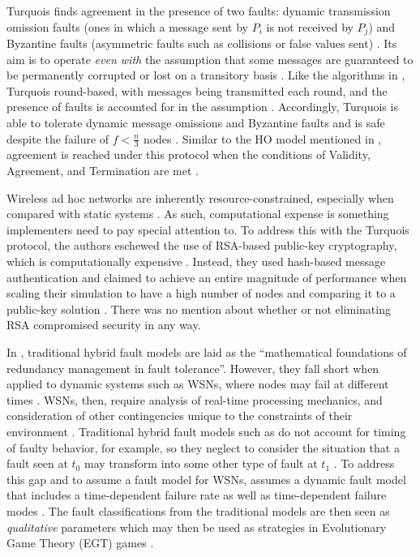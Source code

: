\documentclass[twoside, conference]{IEEEtran}
\begin{document}
Turquois finds agreement in the presence of two faults: dynamic transmission omission faults (ones in which a message sent by $P_i$ is not received by $P_j$) and Byzantine faults (asymmetric faults such as collisions or false values sent) \cite{Moniz2013}. Its aim is to operate \textit{even with} the assumption that some messages are guaranteed to be permanently corrupted or lost on a transitory basis \cite{Moniz2013}. Like the algorithms in \cite{Biely2007}, Turquois round-based, with messages being transmitted each round, and the presence of faults is accounted for in the assumption \cite{Moniz2013}. Accordingly, Turquois is able to tolerate dynamic message omissions and Byzantine faults and is safe despite the failure of $f < \frac{n}{3}$ nodes \cite{Moniz2013}. Similar to the HO model mentioned in \cite{Biely2007}, agreement is reached under this protocol when the conditions of Validity, Agreement, and Termination are met \cite{Moniz2013}.

Wireless ad hoc networks are inherently resource-constrained, especially when compared with static systems \cite{Moniz2013}. As such, computational expense is something implementers need to pay special attention to. To address this with the Turquois protocol, the authors eschewed the use of RSA-based public-key cryptography, which is computationally expensive \cite{Moniz2013}. Instead, they used hash-based message authentication and claimed to achieve an entire magnitude of performance when scaling their simulation to have a high number of nodes and comparing it to a public-key solution \cite{Moniz2013}. There was no mention about whether or not eliminating RSA compromised security in any way.

In \cite{Ma2008}, traditional hybrid fault models are laid as the ``mathematical foundations of redundancy management in fault tolerance''. However, they fall short when applied to dynamic systems such as WSNs, where nodes may fail at different times \cite{Ma2008}. WSNs, then, require analysis of real-time processing mechanics, and consideration of other contingencies unique to the constraints of their environment \cite{Ma2008}. Traditional hybrid fault models such as \cite{Azadmanesh2000} do not account for timing of faulty behavior, for example, so they neglect to consider the situation that a fault seen at $t_0$ may transform into some other type of fault at $t_1$ \cite{Ma2008}. To address this gap and to assume a fault model for WSNs, \cite{Ma2008} assumes a dynamic fault model that includes a time-dependent failure rate as well as time-dependent failure modes \cite{Ma2008}. The fault classifications from the traditional models are then seen as \textit{qualitative} parameters which may then be used as strategies in Evolutionary Game Theory (EGT) games \cite{Ma2008}.
\end{document}
